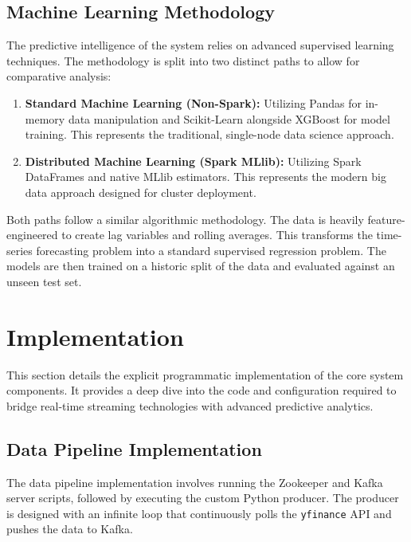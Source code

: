 \documentclass[12pt,a4paper]{report}
\begin{document}
\subsection{Machine Learning Methodology}

The predictive intelligence of the system relies on advanced supervised learning techniques. The methodology is split into two distinct paths to allow for comparative analysis:

\begin{enumerate}
    \item \textbf{Standard Machine Learning (Non-Spark):} Utilizing Pandas for in-memory data manipulation and Scikit-Learn alongside XGBoost for model training. This represents the traditional, single-node data science approach.
    \item \textbf{Distributed Machine Learning (Spark MLlib):} Utilizing Spark DataFrames and native MLlib estimators. This represents the modern big data approach designed for cluster deployment.
\end{enumerate}

Both paths follow a similar algorithmic methodology. The data is heavily feature-engineered to create lag variables and rolling averages. This transforms the time-series forecasting problem into a standard supervised regression problem. The models are then trained on a historic split of the data and evaluated against an unseen test set.

\clearpage

\section{Implementation}

This section details the explicit programmatic implementation of the core system components. It provides a deep dive into the code and configuration required to bridge real-time streaming technologies with advanced predictive analytics.

\subsection{Data Pipeline Implementation}

The data pipeline implementation involves running the Zookeeper and Kafka server scripts, followed by executing the custom Python producer. The producer is designed with an infinite loop that continuously polls the \texttt{yfinance} API and pushes the data to Kafka.
\end{document}
